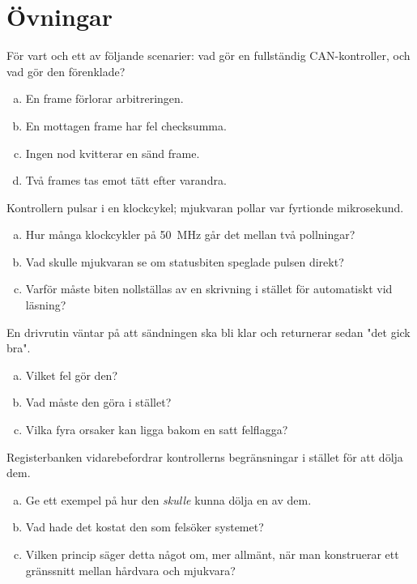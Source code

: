 \section*{Övningar}

\label{ex:7:1}
För vart och ett av följande scenarier: vad gör en fullständig CAN-kontroller, och vad gör den
förenklade?
\begin{enumerate}[a)]
  \item En frame förlorar arbitreringen.
  \item En mottagen frame har fel checksumma.
  \item Ingen nod kvitterar en sänd frame.
  \item Två frames tas emot tätt efter varandra.
\end{enumerate}

\label{ex:7:2}
Kontrollern pulsar i en klockcykel; mjukvaran pollar var fyrtionde mikrosekund.
\begin{enumerate}[a)]
  \item Hur många klockcykler på 50~MHz går det mellan två pollningar?
  \item Vad skulle mjukvaran se om statusbiten speglade pulsen direkt?
  \item Varför måste biten nollställas av en skrivning i stället för automatiskt vid läsning?
\end{enumerate}

\label{ex:7:3}
En drivrutin väntar på att sändningen ska bli klar och returnerar sedan "det gick bra".
\begin{enumerate}[a)]
  \item Vilket fel gör den?
  \item Vad måste den göra i stället?
  \item Vilka fyra orsaker kan ligga bakom en satt felflagga?
\end{enumerate}

\label{ex:7:4}
Registerbanken vidarebefordrar kontrollerns begränsningar i stället för att dölja dem.
\begin{enumerate}[a)]
  \item Ge ett exempel på hur den \emph{skulle} kunna dölja en av dem.
  \item Vad hade det kostat den som felsöker systemet?
  \item Vilken princip säger detta något om, mer allmänt, när man konstruerar ett gränssnitt
    mellan hårdvara och mjukvara?
\end{enumerate}

